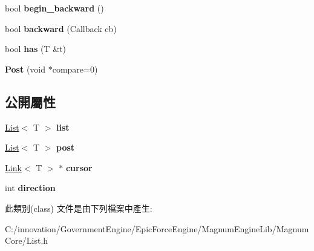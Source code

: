 \begin{DoxyCompactItemize}
\item 
bool {\bfseries begin\+\_\+backward} ()\hypertarget{class_i_dream_sky_1_1_post_a0c43ef12ef908b03fe1fdda3b0a54ebf}{}\label{class_i_dream_sky_1_1_post_a0c43ef12ef908b03fe1fdda3b0a54ebf}

\item 
bool {\bfseries backward} (Callback cb)\hypertarget{class_i_dream_sky_1_1_post_a81009fd6a9d062f484b8916ccb209bee}{}\label{class_i_dream_sky_1_1_post_a81009fd6a9d062f484b8916ccb209bee}

\item 
bool {\bfseries has} (T \&t)\hypertarget{class_i_dream_sky_1_1_post_a0807b5ea476f39a02ae38ed25eab86bf}{}\label{class_i_dream_sky_1_1_post_a0807b5ea476f39a02ae38ed25eab86bf}

\item 
{\bfseries Post} (void $\ast$compare=0)\hypertarget{class_i_dream_sky_1_1_post_ac101f993ed7f88436f82e45eed82a338}{}\label{class_i_dream_sky_1_1_post_ac101f993ed7f88436f82e45eed82a338}

\end{DoxyCompactItemize}
\subsection*{公開屬性}
\begin{DoxyCompactItemize}
\item 
\hyperlink{class_i_dream_sky_1_1_list}{List}$<$ T $>$ {\bfseries list}\hypertarget{class_i_dream_sky_1_1_post_a85dd080fdd25d4af9fd446d4858908fa}{}\label{class_i_dream_sky_1_1_post_a85dd080fdd25d4af9fd446d4858908fa}

\item 
\hyperlink{class_i_dream_sky_1_1_list}{List}$<$ T $>$ {\bfseries post}\hypertarget{class_i_dream_sky_1_1_post_a6c23ff780fc188bd8b2d21716d01e306}{}\label{class_i_dream_sky_1_1_post_a6c23ff780fc188bd8b2d21716d01e306}

\item 
\hyperlink{class_i_dream_sky_1_1_link}{Link}$<$ T $>$ $\ast$ {\bfseries cursor}\hypertarget{class_i_dream_sky_1_1_post_aba57f3ffb6581691f4b839989f12361b}{}\label{class_i_dream_sky_1_1_post_aba57f3ffb6581691f4b839989f12361b}

\item 
int {\bfseries direction}\hypertarget{class_i_dream_sky_1_1_post_aa4f278dd724fd3d494e85151ecb6f4e0}{}\label{class_i_dream_sky_1_1_post_aa4f278dd724fd3d494e85151ecb6f4e0}

\end{DoxyCompactItemize}


此類別(class) 文件是由下列檔案中產生\+:\begin{DoxyCompactItemize}
\item 
C\+:/innovation/\+Government\+Engine/\+Epic\+Force\+Engine/\+Magnum\+Engine\+Lib/\+Magnum\+Core/List.\+h\end{DoxyCompactItemize}
